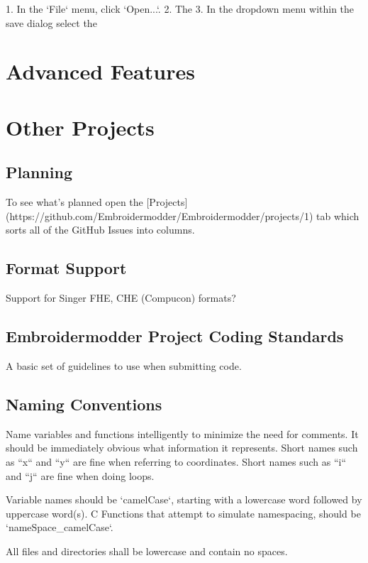 \documentclass[a4paper]{report}
\begin{document}
\begin{enumerate}
1. In the `File` menu, click `Open...`.
2. The 
3. In the dropdown menu within the save dialog select the 
\end{enumerate}

\section{Advanced Features}

\section{Other Projects}

\subsection{Planning}

To see what's planned open the [Projects](https://github.com/Embroidermodder/Embroidermodder/projects/1) tab which sorts all of the GitHub Issues into columns.

\subsection{Format Support}

Support for Singer FHE, CHE (Compucon) formats?

\subsection{Embroidermodder Project Coding Standards}

A basic set of guidelines to use when submitting code.

\subsection{Naming Conventions}

Name variables and functions intelligently to minimize the need for comments.
It should be immediately obvious what information it represents.
Short names such as ``x`` and ``y`` are fine when referring to coordinates.
Short names such as ``i`` and ``j`` are fine when doing loops.

Variable names should be `camelCase`, starting with a lowercase word followed by uppercase word(s).
C Functions that attempt to simulate namespacing, should be `nameSpace\_camelCase`.

All files and directories shall be lowercase and contain no spaces.
\end{document}

